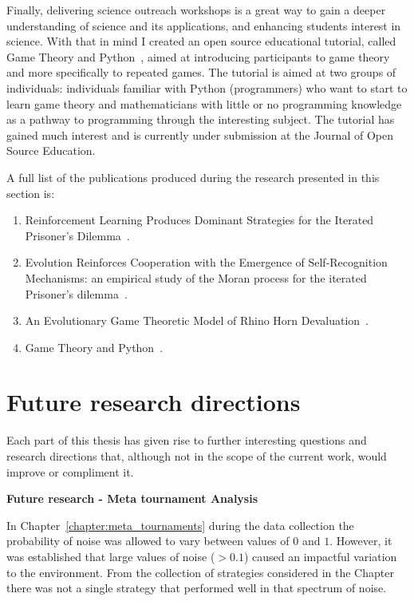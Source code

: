 Finally, delivering science outreach workshops is a great way to gain a deeper
understanding of science and its applications, and enhancing students interest
in science. With that in mind I created an open source educational tutorial, called Game
Theory and Python~\cite{Glynatsi2017_game}, aimed at introducing participants to
game theory and more specifically to repeated games. The tutorial is
aimed at two groups of individuals: individuals familiar with Python (programmers) who want
to start to learn game theory and mathematicians with little or no programming
knowledge as a pathway to programming through the interesting subject. The
tutorial has gained much interest and is currently under submission at the
Journal of Open Source Education.

A full list of the publications produced during the research presented in this
section is:

\begin{enumerate}
    \item Reinforcement Learning Produces Dominant Strategies for the
    Iterated Prisoner's Dilemma~\cite{Knight2017}.
    \item Evolution Reinforces Cooperation with the Emergence of Self-Recognition
    Mechanisms: an empirical study of the Moran process for the iterated
    Prisoner's dilemma~\cite{Harper2017}.
    \item An Evolutionary Game Theoretic Model of Rhino Horn Devaluation~\cite{Glynatsi2018}.
    \item Game Theory and Python~\cite{Glynatsi2017_game}.
\end{enumerate}

\section{Future research directions}

Each part of this thesis has given rise to further interesting questions and
research directions that, although not in the scope of the current work, would
improve or compliment it.

\textbf{Future research - Meta tournament Analysis}

In Chapter~\ref{chapter:meta_tournaments} during the data collection the
probability of noise was allowed to vary between values of \(0\) and \(1\).
However, it was established that large values of noise (\(>
0.1\)) caused an impactful variation to the environment. From the collection of
\numberofstrategies strategies considered in the Chapter there was not a single
strategy that performed well in that spectrum of noise.

